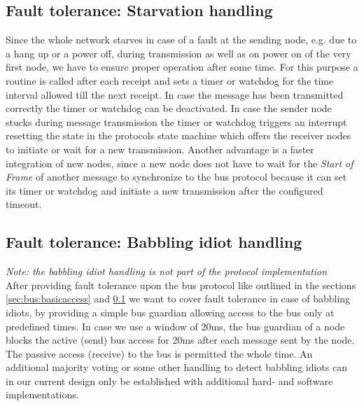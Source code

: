 \subsection{Fault tolerance: Starvation handling}
\label{sec:bus:ftnsh}
Since the whole network starves in case of a fault at the sending node, e.g. due to a hang up or a power off, during transmission as well as on power on of the very first node, we have to ensure proper operation after some time.
For this purpose a routine is called after each receipt and sets a timer or watchdog for the time interval allowed till the next receipt.
In case the message has been transmitted correctly the timer or watchdog can be deactivated.
In case the sender node stucks during message transmission the timer or watchdog triggers an interrupt resetting the state in the protocols state machine which offers the receiver nodes to initiate or wait for a new transmission.
Another advantage is a faster integration of new nodes, since a new node does not have to wait for the \textit{Start of Frame} of another message to synchronize to the bus protocol because it can set its timer or watchdog and initiate a new transmission after the configured timeout.


\subsection {Fault tolerance: Babbling idiot handling}
\label{sec:bus:ftnbi}
\textit{Note: the babbling idiot handling is not part of the protocol implementation}\\

After providing fault tolerance upon the bus protocol like outlined in the sections \ref{sec:bus:basicaccess} and \ref{sec:bus:ftnsh} we want to cover fault tolerance in case of babbling idiots, by providing a simple bus guardian allowing access to the bus only at predefined times.
In case we use a window of 20ms, the bus guardian of a node blocks the active (send) bus access for 20ms after each message sent by the node. The passive access (receive) to the bus is permitted the whole time. An additional majority voting or some other handling to detect babbling idiots can in our current design only be established with additional hard- and software implementations.


